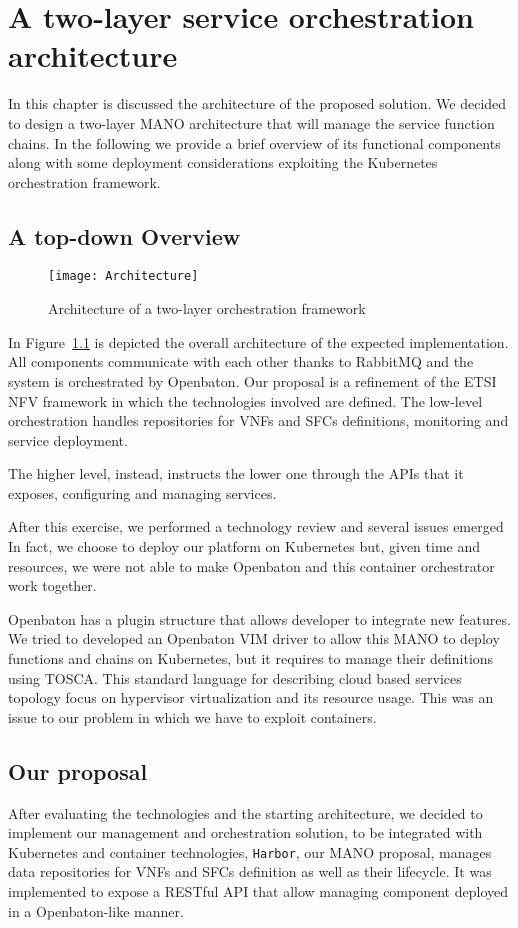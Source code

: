 \chapter{A two-layer service orchestration architecture}
\label{chap:archimpl}
 
In this chapter is discussed the architecture of the proposed solution.
We decided to design a two-layer MANO architecture that will manage
the service function chains. In the following we provide a brief overview of its functional components along with some deployment considerations exploiting the Kubernetes orchestration framework.

\section{A top-down Overview}
\begin{figure}[H]
  \centering
  \texttt{[image: Architecture]}
  \caption{Architecture of a two-layer orchestration framework}
  \label{chap:archimpl:img:architecture}
\end{figure}
In Figure~\ref{chap:archimpl:img:architecture} is depicted the overall
architecture of the expected implementation. All components communicate with
each other thanks to RabbitMQ and the system is orchestrated by Openbaton. Our
proposal is a refinement of the ETSI NFV framework in which the technologies
involved are defined. The low-level orchestration handles
repositories for VNFs and SFCs definitions, monitoring and service deployment.

The higher level, instead, instructs the lower one through the APIs that it
exposes, configuring and managing services. 

After this exercise, we performed a technology review and several issues emerged
In fact, we choose to deploy our
platform on Kubernetes but, given time and resources, we were not able to make
Openbaton and this container orchestrator work together.

Openbaton has a plugin structure that allows developer to integrate new
features. We tried to developed an Openbaton VIM driver to allow this MANO to
deploy functions and chains on Kubernetes, but it requires to manage their
definitions using TOSCA. This standard language for describing cloud based
services topology focus on hypervisor virtualization and its resource usage.
This was an issue to our problem in which we have to exploit containers.

\section{Our proposal}
After evaluating the technologies and the starting architecture, we decided to
implement our management and orchestration solution, to be integrated with
Kubernetes and container technologies, \texttt{Harbor}, our MANO proposal, manages data
repositories for VNFs and SFCs definition as well as their lifecycle.
It was implemented to expose a RESTful API that allow managing
component deployed in a Openbaton-like manner. 

